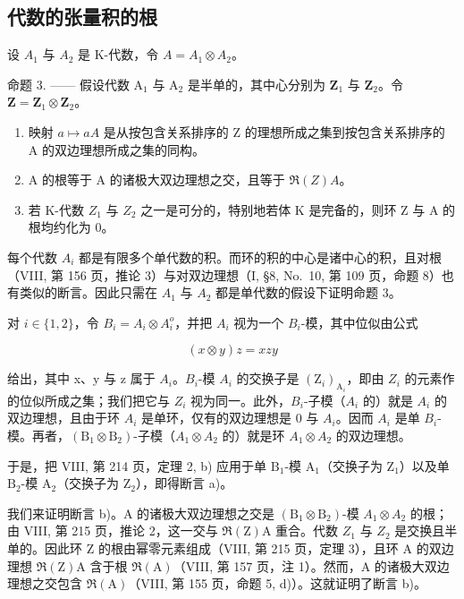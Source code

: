 \subsection{代数的张量积的根}

设 \(A_{1}\) 与 \(A_{2}\) 是 K-代数，令 \(A = A_{1} \otimes A_{2}\)。

命题 3. —— 假设代数 \(\mathrm{A}_1\) 与 \(\mathrm{A}_2\) 是半单的，其中心分别为 \(\mathbf{Z}_1\) 与 \(\mathbf{Z}_2\)。令 \(\mathbf{Z} = \mathbf{Z}_1 \otimes \mathbf{Z}_2\)。

\begin{enumerate}
\def\labelenumi{\alph{enumi})}
\item
  映射 \(a \mapsto aA\) 是从按包含关系排序的 Z 的理想所成之集到按包含关系排序的 A 的双边理想所成之集的同构。
\item
  A 的根等于 A 的诸极大双边理想之交，且等于 \(\Re(Z)A\)。
\item
  若 K-代数 \(Z_{1}\) 与 \(Z_{2}\) 之一是可分的，特别地若体 K 是完备的，则环 Z 与 A 的根均约化为 0。
\end{enumerate}

每个代数 \(A_{i}\) 都是有限多个单代数的积。而环的积的中心是诸中心的积，且对根（VIII, 第 156 页，推论 3）与对双边理想（I, §8, No.~10, 第 109 页，命题 8）也有类似的断言。因此只需在 \(A_{1}\) 与 \(A_{2}\) 都是单代数的假设下证明命题 3。

对 \(i \in \{1,2\}\)，令 \(B_i = A_i \otimes A_i^o\)，并把 \(A_i\) 视为一个 \(B_i\)-模，其中位似由公式

\[
(x \otimes y) z = x z y
\]

给出，其中 x、y 与 z 属于 \(A_{i}\)。\(B_{i}\)-模 \(A_{i}\) 的交换子是 \((\mathrm{Z}_{i})_{\mathrm{A}_{i}}\)，即由 \(Z_{i}\) 的元素作的位似所成之集；我们把它与 \(Z_{i}\) 视为同一。此外，\(B_{i}\)-子模（\(A_{i}\) 的）就是 \(A_{i}\) 的双边理想，且由于环 \(A_{i}\) 是单环，仅有的双边理想是 0 与 \(A_{i}\)。因而 \(A_{i}\) 是单 \(B_{i}\)-模。再者，\((\mathrm{B}_{1}\otimes\mathrm{B}_{2})\)-子模（\(A_{1}\otimes A_{2}\) 的）就是环 \(A_{1}\otimes A_{2}\) 的双边理想。

于是，把 VIII, 第 214 页，定理 2, b) 应用于单 \(\mathrm{B}_1\)-模 \(\mathrm{A}_1\)（交换子为 \(\mathrm{Z}_1\)）以及单 \(\mathrm{B}_2\)-模 \(\mathrm{A}_2\)（交换子为 \(\mathrm{Z}_2\)），即得断言 a)。

我们来证明断言 b)。A 的诸极大双边理想之交是 \((\mathrm{B}_{1}\otimes\mathrm{B}_{2})\)-模 \(A_{1}\otimes A_{2}\) 的根；由 VIII, 第 215 页，推论 2，这一交与 \(\Re(\mathrm{Z})\mathrm{A}\) 重合。代数 \(Z_{1}\) 与 \(Z_{2}\) 是交换且半单的。因此环 Z 的根由幂零元素组成（VIII, 第 215 页，定理 3），且环 A 的双边理想 \(\Re(\mathrm{Z})\mathrm{A}\) 含于根 \(\Re(\mathrm{A})\)（VIII, 第 157 页，注 1）。然而，A 的诸极大双边理想之交包含 \(\Re(\mathrm{A})\)（VIII, 第 155 页，命题 5, d)）。这就证明了断言 b)。

